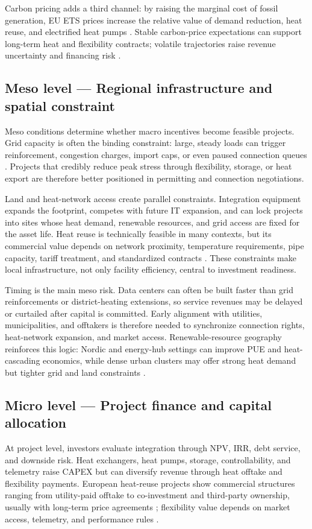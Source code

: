 \documentclass[preprint,12pt]{elsarticle}
\begin{document}
Carbon pricing adds a third channel: by raising the marginal cost of fossil generation, EU ETS prices increase the relative value of demand reduction, heat reuse, and electrified heat pumps \cite{7}. Stable carbon-price expectations can support long-term heat and flexibility contracts; volatile trajectories raise revenue uncertainty and financing risk \cite{15,16}.

\subsection{Meso level --- Regional infrastructure and spatial constraint}
Meso conditions determine whether macro incentives become feasible projects. Grid capacity is often the binding constraint: large, steady loads can trigger reinforcement, congestion charges, import caps, or even paused connection queues \cite{6,21}. Projects that credibly reduce peak stress through flexibility, storage, or heat export are therefore better positioned in permitting and connection negotiations.

Land and heat-network access create parallel constraints. Integration equipment expands the footprint, competes with future IT expansion, and can lock projects into sites whose heat demand, renewable resources, and grid access are fixed for the asset life. Heat reuse is technically feasible in many contexts, but its commercial value depends on network proximity, temperature requirements, pipe capacity, tariff treatment, and standardized contracts \cite{11,23}. These constraints make local infrastructure, not only facility efficiency, central to investment readiness.

Timing is the main meso risk. Data centers can often be built faster than grid reinforcements or district-heating extensions, so service revenues may be delayed or curtailed after capital is committed. Early alignment with utilities, municipalities, and offtakers is therefore needed to synchronize connection rights, heat-network expansion, and market access. Renewable-resource geography reinforces this logic: Nordic and energy-hub settings can improve PUE and heat-cascading economics, while dense urban clusters may offer strong heat demand but tighter grid and land constraints \cite{24,25}.

\subsection{Micro level --- Project finance and capital allocation}
At project level, investors evaluate integration through NPV, IRR, debt service, and downside risk. Heat exchangers, heat pumps, storage, controllability, and telemetry raise CAPEX but can diversify revenue through heat offtake and flexibility payments. European heat-reuse projects show commercial structures ranging from utility-paid offtake to co-investment and third-party ownership, usually with long-term price agreements \cite{23}; flexibility value depends on market access, telemetry, and performance rules \cite{12,13}.
\end{document}
